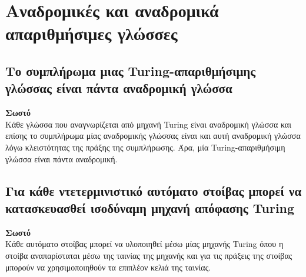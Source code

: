 \section{Αναδρομικές και αναδρομικά απαριθμήσιμες γλώσσες}
\subsection{Το συμπλήρωμα μιας Turing-απαριθμήσιμης γλώσσας είναι πάντα αναδρομική γλώσσα}
\textbf{Σωστό}\\
Κάθε γλώσσα που αναγνωρίζεται από μηχανή Turing είναι αναδρομική γλώσσα και επίσης το συμπλήρωμα μίας αναδρομικής γλώσσας είναι και αυτή αναδρομική γλώσσα λόγω κλειστότητας της πράξης της συμπλήρωσης. Άρα, μία Turing-απαριθμήσιμη γλώσσα είναι πάντα αναδρομική.
\noindent\\
\subsection{Για κάθε ντετερμινιστικό αυτόματο στοίβας μπορεί να κατασκευασθεί ισοδύναμη μηχανή απόφασης Turing}
\textbf{Σωστό}\\
Κάθε αυτόματο στοίβας μπορεί να υλοποιηθεί μέσω μίας μηχανής Turing όπου η στοίβα αναπαρίσταται μέσω της ταινίας της μηχανής και για τις πράξεις της στοίβας μπορούν να χρησιμοποιηθούν τα επιπλέον κελιά της ταινίας. 
\noindent\\